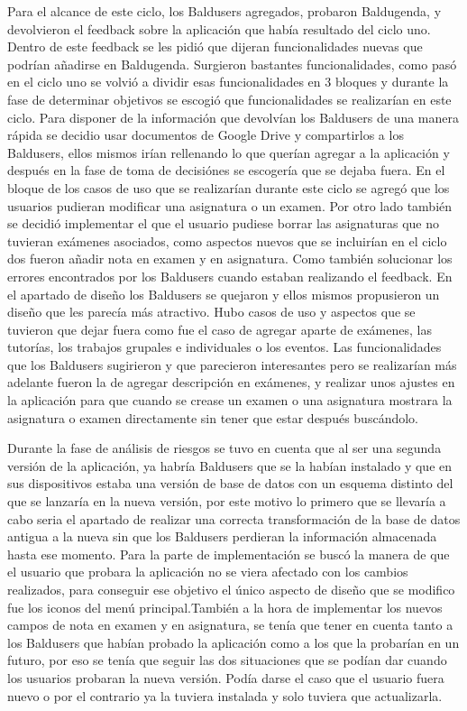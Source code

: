 Para el alcance de este ciclo, los Baldusers agregados, probaron Baldugenda, y devolvieron el feedback sobre la aplicación que había resultado del ciclo uno. Dentro de este feedback se les pidió que dijeran funcionalidades nuevas que podrían añadirse en Baldugenda. Surgieron bastantes funcionalidades, como pasó en el ciclo uno se volvió a dividir esas funcionalidades en 3 bloques y durante la fase de determinar objetivos se escogió que funcionalidades se realizarían en este ciclo.
Para disponer de la información que devolvían los Baldusers de una manera rápida se decidio usar documentos de Google Drive y compartirlos a los Baldusers, ellos mismos irían rellenando lo que querían agregar a la aplicación y después en la fase de toma de decisiónes se escogería que se dejaba fuera.
En el bloque de los casos de uso que se realizarían durante este ciclo se agregó que los usuarios pudieran modificar una asignatura o un examen. Por otro lado también se decidió implementar el que el usuario pudiese borrar las asignaturas que no tuvieran exámenes asociados,  como aspectos nuevos que se incluirían en el ciclo dos fueron añadir nota en examen y en asignatura. Como también solucionar los errores encontrados por los Baldusers cuando estaban realizando el feedback. En el apartado de diseño los Baldusers se quejaron y ellos mismos propusieron un diseño que les parecía más atractivo.
Hubo casos de uso y aspectos que se tuvieron que dejar fuera como fue el caso de agregar aparte de exámenes, las tutorías, los trabajos grupales e individuales o los eventos.
Las funcionalidades que los Baldusers sugirieron y que parecieron interesantes pero se realizarían más adelante fueron la de agregar descripción en exámenes, y realizar unos ajustes en la aplicación para que cuando se crease un examen o una asignatura mostrara la asignatura o examen directamente sin tener que estar después buscándolo.

Durante la fase de análisis de riesgos se tuvo en cuenta que al ser una segunda versión de la aplicación, ya habría Baldusers que se la habían instalado y que en sus dispositivos estaba una versión de base de datos con un esquema distinto del que se lanzaría en la nueva versión, por este motivo lo primero que se llevaría a cabo seria el apartado de realizar una correcta transformación de la base de datos antigua a la nueva sin que los Baldusers perdieran la información almacenada hasta ese momento.
Para la parte de implementación se buscó la manera de que el usuario que probara la aplicación no se viera afectado con los cambios realizados, para conseguir ese objetivo el único aspecto de diseño que se modifico fue los iconos del menú principal.También a la hora de implementar los nuevos campos de nota en examen y en asignatura, se tenía que tener en cuenta tanto a los Baldusers que habían probado la aplicación como a los que la probarían en un futuro, por eso se tenía que seguir las dos situaciones que se podían dar cuando los usuarios probaran la nueva versión. Podía darse el caso que el usuario fuera nuevo o por el contrario ya la tuviera instalada y solo tuviera que actualizarla.

